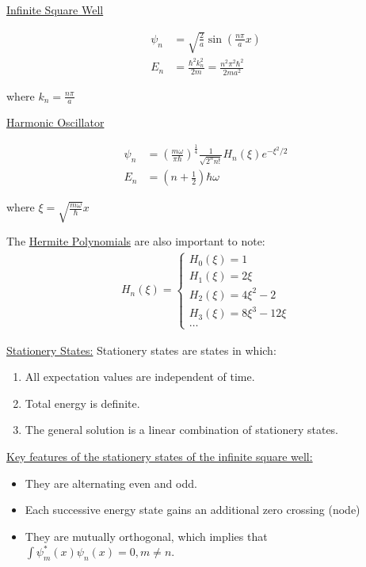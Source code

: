 \documentclass{article}
\newcommand{\centertext}[1]{\begin{center}#1\end{center}}
\newcommand{\sheader}[1]{\underline{#1:}}
\newcommand{\ds}{\displaystyle}
\begin{document}
    \begin{multicols}{2}
        \centertext{\underline{Infinite Square Well}}
        \begin{align*}
            \psi_n &= \sqrt{\frac{2}{a}}\sin\left(\frac{n\pi}{a}x\right)\\
            E_n &= \frac{\hbar^2 k_n^2}{2m} = \frac{n^2 \pi^2 \hbar^2}{2ma^2}
        \end{align*}
        \centertext{where $k_n = \frac{n\pi}{a}$}
        \vfill\null
        \columnbreak
        \centertext{\underline{Harmonic Oscillator}}
        \begin{align*}
            \psi_n &= \left(\frac{m\omega}{\pi \hbar}\right)^{\frac{1}{4}} \frac{1}{\sqrt{2^n n!}}H_n(\xi)e^{-\xi^2/2}\\
            E_n &= \left(n + \frac{1}{2}\right) \hbar \omega
        \end{align*}
        \centertext{where $\ds \xi = \sqrt{\frac{m\omega}{\hbar}}x$}
        \vfill\null
    \end{multicols}

    The \underline{Hermite Polynomials} are also important to note:
    \begin{align*}
        H_n(\xi) = \begin{cases}
            H_0(\xi) = 1 \\
            H_1(\xi) = 2\xi\\
            H_2(\xi) = 4\xi^2-2\\
            H_3(\xi) = 8\xi^3 - 12\xi\\
            \ldots
            \end{cases}
    \end{align*}

    \pagebreak

    \sheader{Stationery States} Stationery states are states in which:
    \begin{enumerate}
        \item All expectation values are independent of time.
        \item Total energy is definite.
        \item The general solution is a linear combination of stationery
        states.
    \end{enumerate}

    \sheader{Key features of the stationery states of the infinite square well}
    \begin{itemize}
        \item They are alternating even and odd.
        \item Each successive energy state gains an additional zero 
        crossing (node)
        \item They are mutually orthogonal, which implies that $\ds \int \psi_m^*(x) \psi_n(x) = 0, m \neq n$.
    \end{itemize}
\end{document}
